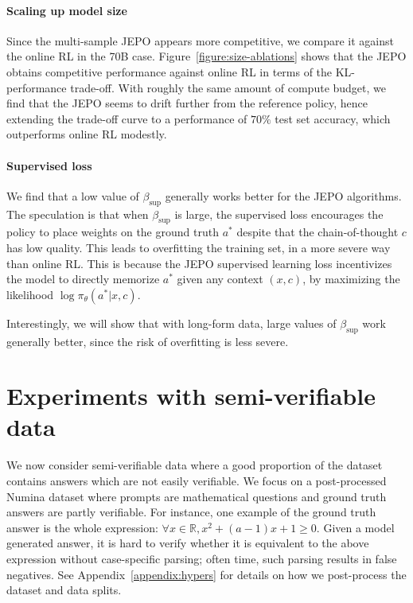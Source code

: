 \documentclass{article}
\theoremstyle{definition}
\begin{document}
\paragraph{Scaling up model size} Since the multi-sample JEPO appears more competitive, we compare it against the online RL in the 70B case. Figure~\ref{figure:size-ablations} shows that the JEPO obtains competitive performance against online RL in terms of the KL-performance trade-off. With roughly the same amount of compute budget, we find that the JEPO seems to drift further from the reference policy, hence extending the trade-off curve to a performance of $70\%$ test set accuracy, which outperforms online RL modestly.

\paragraph{Supervised loss} We find that a low value of $\beta_\text{sup}$ generally works better for the JEPO algorithms. The speculation is that when $\beta_\text{sup}$ is large, the supervised loss encourages the policy to place weights on the ground truth $a^*$ despite that the chain-of-thought $c$ has low quality. This leads to overfitting the training set, in a more severe way than online RL. This is because the JEPO supervised learning loss incentivizes the model to directly memorize $a^*$ given any context $(x,c)$, by maximizing the likelihood $\log \pi_\theta(a^*|x,c)$.

Interestingly, we will show that with long-form data, large values of $\beta_\text{sup}$ work generally better, since the risk of overfitting is less severe.

 \section{Experiments with semi-verifiable data}
\label{sec:exp-semi}

We now consider semi-verifiable data where a good proportion of the dataset contains answers which are not easily verifiable. We focus on a post-processed Numina dataset \citep{numina_math_datasets} where prompts are mathematical questions and ground truth answers are partly verifiable. For instance, one example of the ground truth answer is the whole expression: {\tt $\forall x \in \mathbb{R}, x^2 + (a-1)x + 1 \geq 0$}. Given a model generated answer, it is hard to verify whether it is equivalent to the above expression without case-specific parsing; often time, such parsing results in false negatives. See Appendix~\ref{appendix:hypers} for details on how we post-process the dataset and data splits.
\end{document}
